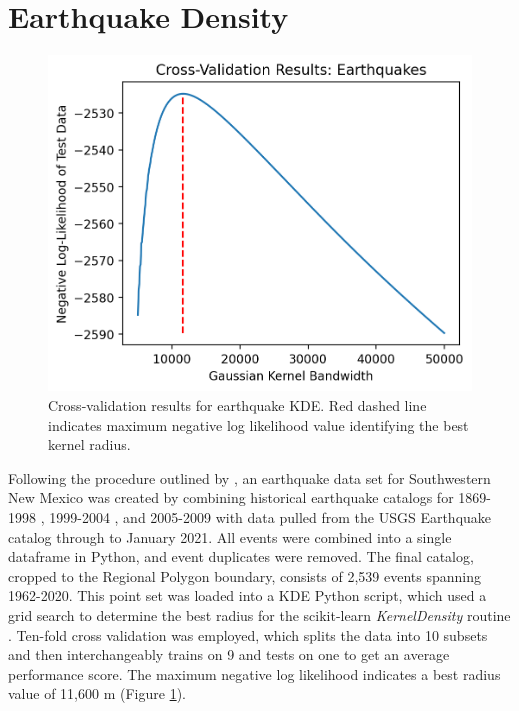 \section{Earthquake Density}\label{app:dl_eq_density}
\begin{figure}
\centering
\includegraphics[scale=0.6]{templates/images/Figure-Earthquakes_kde_gridsearchcv_result.png}
\singlespacing
\caption[Earthquake density parameter tuning]{Cross-validation results for earthquake KDE. Red dashed line indicates maximum negative log likelihood value identifying the best kernel radius.}
\label{fig:EQ_cv}
\end{figure}
Following the procedure outlined by \citet{pepin_new_2019}, an earthquake data set for Southwestern New Mexico was created by combining historical earthquake catalogs for 1869-1998 \citep{sanford_earthquake_2002}, 1999-2004 \citep{sanford_earthquake_2006}, and 2005-2009 \citep{pursley_earthquake_2013} with data pulled from the USGS Earthquake catalog \citep{usgs_earthquake_2021} through to January 2021. All events were combined into a single dataframe in Python, and event duplicates were removed. The final catalog, cropped to the Regional Polygon boundary, consists of 2,539 events spanning 1962-2020. This point set was loaded into a KDE Python script, which used a grid search to determine the best radius for the scikit-learn \textit{KernelDensity} routine \citep{pedregosa_scikit-learn_2011}. Ten-fold cross validation was employed, which splits the data into 10 subsets and then interchangeably trains on 9 and tests on one to get an average performance score. The maximum negative log likelihood indicates a best radius value of 11,600 m (Figure \ref{fig:EQ_cv}). 

